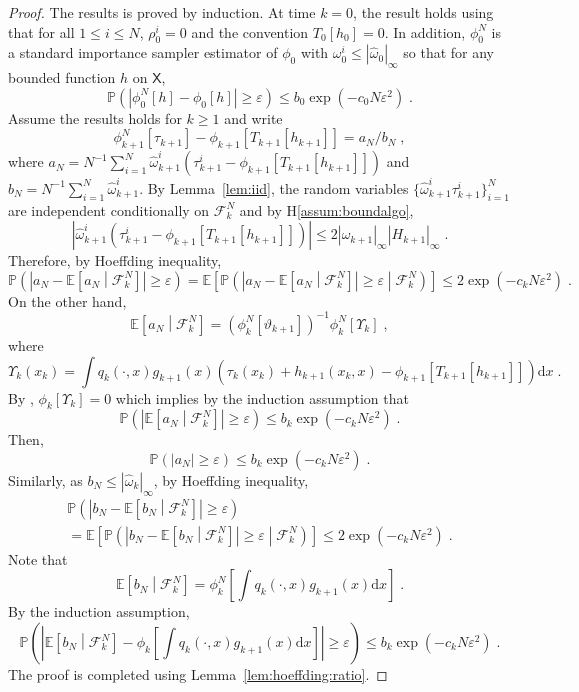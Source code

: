 \documentclass[12pt,draft]{article}
\newcommand{\rmd}{\mathrm{d}}
\newcommand{\eqsp}{\;}
\newcommand{\1}{\mathrm{1}}
\begin{document}
\begin{proof}
The results is proved by induction. At time $k=0$, the result holds using that for all $1\le i \le N$, $\rho_0^i = 0$ and the convention $T_0[h_0] =0$. In addition, $\phi_0^N$ is a standard importance sampler estimator of $\phi_0$ with $\omega_0^i\le |\widehat{\omega}_0|_{\infty}$ so that for any bounded function $h$ on $\mathsf{X}$,
\[
\mathbb{P}\left(\left|\phi_0^N[h] - \phi_0\left[h\right]\right|\ge \varepsilon\right)\le b_0\exp\left(-c_0N\varepsilon^2\right)\eqsp.
\]
Assume the results holds for $k\ge 1$ and write
\[
\phi_{k+1}^N[\tau_{k+1}] - \phi_{k+1}\left[T_{k+1}[h_{k+1}]\right] = a_N/b_N\eqsp,
\]
where $a_N = N^{-1}\sum_{i=1}^N \widehat{\omega}_{k+1}^i \left(\tau_{k+1}^i - \phi_{k+1}\left[T_{k+1}[h_{k+1}]\right]\right)$ and $b_N =N^{-1}\sum_{i=1}^N \widehat{\omega}_{k+1}^i$. By Lemma~\ref{lem:iid}, the random variables $\{\widehat{\omega}_{k+1}^i\tau_{k+1}^i\}_{i=1}^N$ are independent conditionally on $\mathcal{F}_k^{N}$ and by H\ref{assum:boundalgo},
\[
\left|\widehat{\omega}_{k+1}^i \left(\tau_{k+1}^i - \phi_{k+1}\left[T_{k+1}[h_{k+1}]\right]\right)\right| \le 2|\widehat{\omega}_{k+1}|_{\infty}|H_{k+1}|_{\infty}\eqsp.
\]
Therefore, by Hoeffding inequality,
\[
\mathbb{P}\left(\left|a_N - \mathbb{E}\left[a_N\middle|\mathcal{F}_k^{N}\right]\right|\ge \varepsilon\right) = \mathbb{E}\left[\mathbb{P}\left(\left|a_N - \mathbb{E}\left[a_N\middle|\mathcal{F}_k^{N}\right]\right|\ge \varepsilon\middle|\mathcal{F}_k^{N}\right)\right]\le 2\exp\left(-c_kN\varepsilon^2\right)\eqsp.
\] 
On the other hand,
\[
\mathbb{E}\left[a_N\middle|\mathcal{F}_k^{N}\right] = \left(\phi^N_{k}[\vartheta_{k+1}]\right)^{-1}\phi^N_{k}\left[\Upsilon_k\right] \eqsp,
\]
where
\[
\Upsilon_k(x_k) = \int q_{k}(\cdot,x)g_{k+1}(x)\left(\tau_k(x_k) + h_{k+1}(x_k,x) - \phi_{k+1}\left[T_{k+1}[h_{k+1}]\right]\right)\rmd x\eqsp.
\]
By \cite[Lemma~11]{olsson:westerborn:2016}, $\phi_{k}\left[\Upsilon_k\right] = 0$ which implies by the induction assumption that 
\[
\mathbb{P}\left(\left|\mathbb{E}\left[a_N\middle|\mathcal{F}_k^{N}\right]\right|\ge \varepsilon\right)\le b_k\exp\left(-c_kN\varepsilon^2\right)\eqsp.
\]
Then,
\[
\mathbb{P}\left(\left|a_N\right|\ge \varepsilon\right) \le b_k\exp\left(-c_kN\varepsilon^2\right)\eqsp.
\] 
Similarly, as $b_N \le |\widehat{\omega}_k|_{\infty}$, by Hoeffding inequality,
\begin{multline*}
\mathbb{P}\left(\left|b_N - \mathbb{E}\left[b_N\middle|\mathcal{F}_k^{N}\right]\right|\ge \varepsilon\right) \\
= \mathbb{E}\left[\mathbb{P}\left(\left|b_N - \mathbb{E}\left[b_N\middle|\mathcal{F}_k^{N}\right]\right|\ge \varepsilon\middle|\mathcal{F}_k^{N}\right)\right]\le 2\exp\left(-c_kN\varepsilon^2\right)\eqsp.
\end{multline*}
Note that
\[
\mathbb{E}\left[b_N\middle|\mathcal{F}_k^{N}\right] = \phi^N_{k}\left[\int q_{k}(\cdot,x)g_{k+1}(x)\rmd x\right]\eqsp.
\]
By  the induction assumption,
\[
\mathbb{P}\left(\left|\mathbb{E}\left[b_N\middle|\mathcal{F}_k^{N}\right]-\phi_k\left[\int q_{k}(\cdot,x)g_{k+1}(x)\rmd x\right]\right|\ge \varepsilon\right)\le b_k\exp\left(-c_kN\varepsilon^2\right)\eqsp.
\]
The proof is completed using Lemma~\ref{lem:hoeffding:ratio}.
\end{proof}
\end{document}
